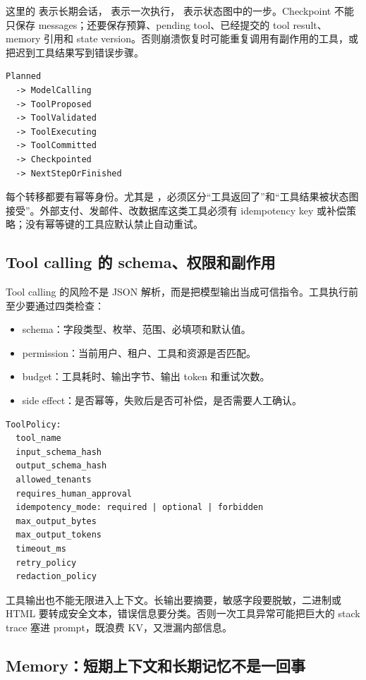 这里的  表示长期会话， 表示一次执行， 表示状态图中的一步。Checkpoint 不能只保存 messages；还要保存预算、pending tool、已经提交的 tool result、memory 引用和 state version。否则崩溃恢复时可能重复调用有副作用的工具，或把迟到工具结果写到错误步骤。

\begin{lstlisting}[numbers=none,caption={Agent step 状态机}]
Planned
  -> ModelCalling
  -> ToolProposed
  -> ToolValidated
  -> ToolExecuting
  -> ToolCommitted
  -> Checkpointed
  -> NextStepOrFinished
\end{lstlisting}

每个转移都要有幂等身份。尤其是 ，必须区分“工具返回了”和“工具结果被状态图接受”。外部支付、发邮件、改数据库这类工具必须有 idempotency key 或补偿策略；没有幂等键的工具应默认禁止自动重试。

\subsection{Tool calling 的 schema、权限和副作用}

Tool calling 的风险不是 JSON 解析，而是把模型输出当成可信指令。工具执行前至少要通过四类检查：

\begin{itemize}
  \item schema：字段类型、枚举、范围、必填项和默认值。
  \item permission：当前用户、租户、工具和资源是否匹配。
  \item budget：工具耗时、输出字节、输出 token 和重试次数。
  \item side effect：是否幂等，失败后是否可补偿，是否需要人工确认。
\end{itemize}

\begin{lstlisting}[numbers=none,caption={ToolPolicy}]
ToolPolicy:
  tool_name
  input_schema_hash
  output_schema_hash
  allowed_tenants
  requires_human_approval
  idempotency_mode: required | optional | forbidden
  max_output_bytes
  max_output_tokens
  timeout_ms
  retry_policy
  redaction_policy
\end{lstlisting}

工具输出也不能无限进入上下文。长输出要摘要，敏感字段要脱敏，二进制或 HTML 要转成安全文本，错误信息要分类。否则一次工具异常可能把巨大的 stack trace 塞进 prompt，既浪费 KV，又泄漏内部信息。

\subsection{Memory：短期上下文和长期记忆不是一回事}

